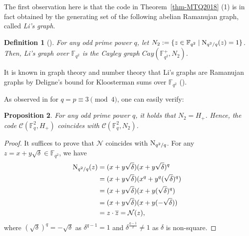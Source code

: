 \documentclass{amsart}
\newtheorem{theorem}{Theorem}%
\newtheorem{proposition}[theorem]{Proposition}
\newtheorem{definition}[theorem]{Definition}
\numberwithin{equation}{section}
\newcommand{\F}{\mathbb{F}}
\newcommand{\Nsq}{{\rm N}_{q^2/q}}
\begin{document}


The first observation here is that the code in Theorem~\ref{thm-MTQ2018} (1) is in fact obtained by the generating set of the following abelian Ramanujan graph, called {\it Li's graph}.

\begin{definition}[\cite{LK1992}]
For any odd prime power $q$,
let $N_2:=\{z \in \F_{q^2} \mid \Nsq(z)=1\}$.
Then, {\it Li's graph} %
over $\F_{q^2}$ is the Cayley graph $Cay(\F_{q^2}^+, N_2)$.  
\end{definition}

It is known in graph theory and number theory that Li's graphs are Ramanujan graphs by Deligne's bound for Kloosterman sums over $\F_{q^2}$ (\cite{LK1992, D2023}). 

As observed in \cite{BKS2016} for $q=p \equiv 3 \pmod{4}$, one can easily verify:

\begin{proposition}
\label{prop-Li}
For any odd prime power $q$, it holds that $N_2=H_{+}$. 
Hence, the code $\mathcal{C}(\F_q^2, H_{+})$ coincides with $\mathcal{C}(\F_q^2, N_2)$.
\end{proposition}

\begin{proof}
It suffices to prove that $\mathcal{N}$ coincides with $\Nsq$.
For any $z=x+y\sqrt{\delta} \in \F_{q^2}$, we have
\begin{align*}
    \Nsq(z)
    &=(x+y\sqrt{\delta})(x+y\sqrt{\delta})^q\\
    &=(x+y\sqrt{\delta})(x^q+y^q (\sqrt{\delta})^q)\\
    &=(x+y\sqrt{\delta})(x+y  (\sqrt{\delta})^q)\\
    &=(x+y\sqrt{\delta})(x+y (-\sqrt{\delta}))\\
    &=z\cdot \overline{z}=\mathcal{N}(z),
\end{align*}
where $ (\sqrt{\delta})^q=-\sqrt{\delta}$ as $\delta^{q-1}=1$ and $\delta^{\frac{q-1}{2}}\neq 1$ as $\delta$ is non-square.
\end{proof}
\end{document}
